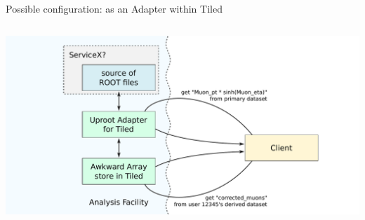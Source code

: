 \documentclass[aspectratio=169]{beamer}
\begin{document}
\begin{frame}{Possible configuration: as an Adapter within Tiled}
\vspace{0.16 cm}
\begin{columns}
\includegraphics[width=\linewidth]{possible-tiled-adapter.pdf}
\end{columns}
\end{frame}
\end{document}
